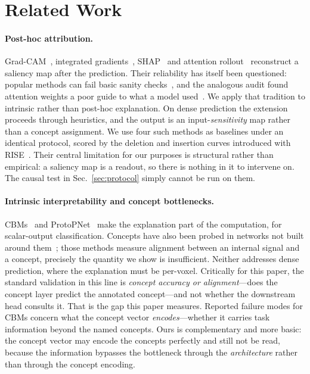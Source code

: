 \section{Related Work}
\label{sec:related}

\paragraph{Post-hoc attribution.}
Grad-CAM~\cite{selvaraju2017gradcam}, integrated gradients~\cite{sundararajan2017ig},
SHAP~\cite{lundberg2017shap} and attention rollout~\cite{abnar2020rollout} reconstruct a saliency
map after the prediction. Their reliability has itself been questioned: popular methods
can fail basic sanity checks~\cite{adebayo2018sanity}, and the analogous audit found attention
weights a poor guide to what a model used~\cite{jain2019attention}. We apply that tradition to
intrinsic rather than post-hoc explanation. On dense prediction the extension proceeds
through heuristics, and the
output is an input-\emph{sensitivity} map rather than a concept assignment. We use four such
methods as baselines under an identical protocol, scored by the deletion and insertion curves
introduced with RISE~\cite{petsiuk2018rise}. Their central limitation for our purposes is
structural rather than empirical: a saliency map is a readout, so there is nothing in it to
intervene on. The causal test in Sec.~\ref{sec:protocol} simply cannot be run on them.

\paragraph{Intrinsic interpretability and concept bottlenecks.}
CBMs~\cite{koh2020cbm} and ProtoPNet~\cite{chen2019protopnet} make the explanation part of the
computation, for scalar-output classification. Concepts have also been probed in networks not built around
them~\cite{kim2018tcav,bau2017dissection}; those methods measure alignment between an internal
signal and a concept, precisely the quantity we show is insufficient. Neither addresses dense prediction, where the
explanation must be per-voxel. Critically for this paper, the standard validation in this line is
\emph{concept accuracy or alignment}---does the concept layer predict the annotated
concept---and not whether the downstream head consults it. That is the gap this paper
measures. Reported failure modes for CBMs concern what the concept vector \emph{encodes}---whether
it carries task information beyond the named concepts. Ours is complementary and more basic:
the concept vector may encode the concepts perfectly and still not be read, because the
information bypasses the bottleneck through the \emph{architecture} rather than through
the concept encoding.

